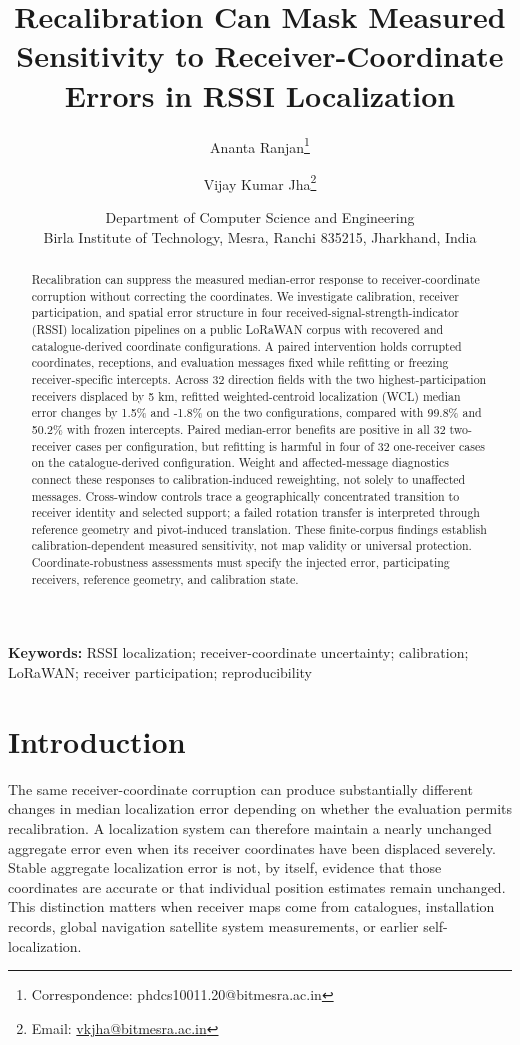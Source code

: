 \documentclass[11pt,a4paper]{article}
\title{Recalibration Can Mask Measured Sensitivity to Receiver-Coordinate Errors in RSSI Localization}
\author{Ananta Ranjan\thanks{Correspondence: phdcs10011.20@bitmesra.ac.in} \and Vijay Kumar Jha\thanks{Email: \href{mailto:vkjha@bitmesra.ac.in}{vkjha@bitmesra.ac.in}}}
\date{Department of Computer Science and Engineering\\Birla Institute of Technology, Mesra, Ranchi 835215, Jharkhand, India}
\begin{document}
\maketitle
\begin{abstract}
Recalibration can suppress the measured median-error response to receiver-coordinate corruption without correcting the coordinates. We investigate calibration, receiver participation, and spatial error structure in four received-signal-strength-indicator (RSSI) localization pipelines on a public LoRaWAN corpus with recovered and catalogue-derived coordinate configurations. A paired intervention holds corrupted coordinates, receptions, and evaluation messages fixed while refitting or freezing receiver-specific intercepts. Across 32 direction fields with the two highest-participation receivers displaced by 5 km, refitted weighted-centroid localization (WCL) median error changes by 1.5\% and -1.8\% on the two configurations, compared with 99.8\% and 50.2\% with frozen intercepts. Paired median-error benefits are positive in all 32 two-receiver cases per configuration, but refitting is harmful in four of 32 one-receiver cases on the catalogue-derived configuration. Weight and affected-message diagnostics connect these responses to calibration-induced reweighting, not solely to unaffected messages. Cross-window controls trace a geographically concentrated transition to receiver identity and selected support; a failed rotation transfer is interpreted through reference geometry and pivot-induced translation. These finite-corpus findings establish calibration-dependent measured sensitivity, not map validity or universal protection. Coordinate-robustness assessments must specify the injected error, participating receivers, reference geometry, and calibration state.
\end{abstract}
\noindent\textbf{Keywords:} RSSI localization; receiver-coordinate uncertainty; calibration; LoRaWAN; receiver participation; reproducibility

\section{Introduction}\label{sec:intro}
The same receiver-coordinate corruption can produce substantially different changes in median localization error depending on whether the evaluation permits recalibration. A localization system can therefore maintain a nearly unchanged aggregate error even when its receiver coordinates have been displaced severely. Stable aggregate localization error is not, by itself, evidence that those coordinates are accurate or that individual position estimates remain unchanged. This distinction matters when receiver maps come from catalogues, installation records, global navigation satellite system measurements, or earlier self-localization.
\end{document}
